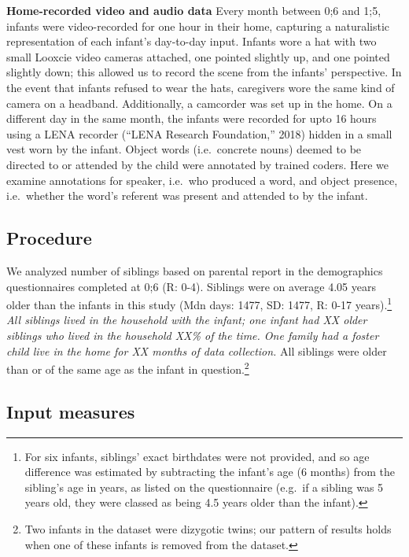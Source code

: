 \documentclass[
  man,floatsintext]{apa6}
\begin{document}
\textbf{Home-recorded video and audio data} Every month between 0;6 and 1;5, infants were video-recorded for one hour in their home, capturing a naturalistic representation of each infant's day-to-day input. Infants wore a hat with two small Looxcie video cameras attached, one pointed slightly up, and one pointed slightly down; this allowed us to record the scene from the infants' perspective. In the event that infants refused to wear the hats, caregivers wore the same kind of camera on a headband. Additionally, a camcorder was set up in the home. On a different day in the same month, the infants were recorded for upto 16 hours using a LENA recorder ({``{LENA} {Research} {Foundation},''} 2018) hidden in a small vest worn by the infant. Object words (i.e.~concrete nouns) deemed to be directed to or attended by the child were annotated by trained coders. Here we examine annotations for speaker, i.e.~who produced a word, and object presence, i.e.~whether the word's referent was present and attended to by the infant.

\hypertarget{procedure}{%
\subsection{Procedure}\label{procedure}}

We analyzed number of siblings based on parental report in the demographics questionnaires completed at 0;6 (R: 0-4). Siblings were on average 4.05 years older than the infants in this study (Mdn days: 1477, SD: 1477, R: 0-17 years).\footnote{For six infants, siblings' exact birthdates were not provided, and so age difference was estimated by subtracting the infant's age (6 months) from the sibling's age in years, as listed on the questionnaire (e.g.~if a sibling was 5 years old, they were classed as being 4.5 years older than the infant).} \emph{All siblings lived in the household with the infant; one infant had XX older siblings who lived in the household XX\% of the time. One family had a foster child live in the home for XX months of data collection.} All siblings were older than or of the same age as the infant in question.\footnote{Two infants in the dataset were dizygotic twins; our pattern of results holds when one of these infants is removed from the dataset.}

\hypertarget{input-measures}{%
\subsection{Input measures}\label{input-measures}}
\end{document}

